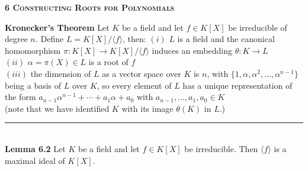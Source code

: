 \documentclass[a4paper]{article}
\begin{document}
\begin{framed}
	\begin{center}
		\textbf{\textsc{6 Constructing Roots for Polynomials}}
	\end{center}
	\textbf{Kronecker's Theorem} Let $K$ be a field and let $f \in K[X]$ be irreducible of degree $n$. Define $L = K[X] / \langle f \rangle$, then:
	$(i)$ $L$ is a field and the canonical homomorphism $\pi : K[X] \rightarrow K[X] / \langle f \rangle$ induces an embedding $\theta: K \rightarrow L$\\
	$(ii)$ $\alpha = \pi(X) \in L$ is a root of $f$\\
	$(iii)$ the dimension of $L$ as a vector space over $K$ is $n$, with $\{1, \alpha, \alpha^2, \dots, \alpha^{n-1}\}$ being a basis of $L$ over $K$, so every element of $L$ has a unique representation of the form $a_{n-1}\alpha^{n-1} + \cdots + a_1\alpha + a_0$ with $a_{n-1}, \dots, a_1, a_0 \in K$\\
	(note that we have identified $K$ with its image $\theta(K)$ in $L$.)
	
	\noindent\rule{\textwidth}{0.5pt}\\
	
	\noindent
	\textbf{Lemma 6.2} Let $K$ be a field and let $f \in K[X]$ be irreducible. Then $\langle f \rangle$ is a maximal ideal of $K[X]$.
\end{framed}
\end{document}
